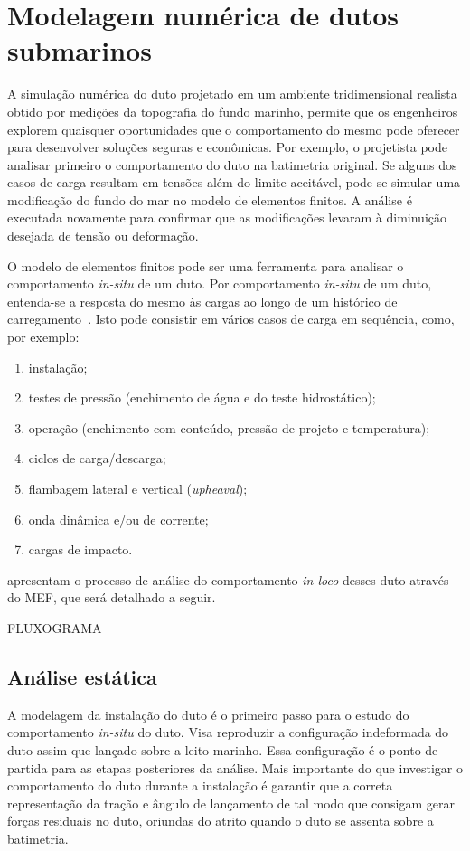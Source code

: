 \section{Modelagem numérica de dutos submarinos}\label{chap:assentamento}


A simulação numérica do duto projetado em um ambiente tridimensional realista obtido por medições da topografia do fundo marinho, permite que os engenheiros explorem quaisquer oportunidades que o comportamento do mesmo pode oferecer para desenvolver soluções seguras e econômicas.
Por exemplo, o projetista pode analisar primeiro o comportamento do duto na batimetria original.
Se alguns dos casos de carga resultam em tensões além do limite aceitável, pode-se simular uma modificação do fundo do mar no modelo de elementos finitos.
A análise é executada novamente para confirmar que as modificações levaram à diminuição desejada de tensão ou deformação.

O modelo de elementos finitos pode ser uma ferramenta para analisar o comportamento \textit{in-situ} de um duto.
Por comportamento \textit{in-situ} de um duto, entenda-se a resposta do mesmo às cargas ao longo de um histórico de carregamento~\cite{Bai2014}. Isto pode consistir em vários casos de carga em sequência, como, por exemplo:

\begin{enumerate}
    \item instalação;
    \item testes de pressão (enchimento de água e do teste hidrostático);
    \item operação (enchimento com conteúdo, pressão de projeto e temperatura);
    \item ciclos de carga/descarga;
    \item flambagem lateral e vertical (\textit{upheaval});
    \item onda dinâmica e/ou de corrente;
    \item cargas de impacto.
\end{enumerate}

 apresentam o processo de análise do comportamento \textit{in-loco} desses duto através do  MEF, que será detalhado a seguir.

FLUXOGRAMA

\subsection{Análise estática}


A modelagem da instalação do duto é o primeiro passo para o estudo do comportamento \textit{in-situ} do duto. Visa reproduzir a configuração indeformada do duto assim que lançado sobre a leito marinho.
Essa configuração é o ponto de partida para as etapas posteriores da análise.
Mais importante do que investigar o comportamento do duto durante a instalação é garantir que a correta representação da tração e ângulo de lançamento de tal modo que consigam gerar forças residuais no duto, oriundas do atrito quando o duto se assenta sobre a batimetria.


